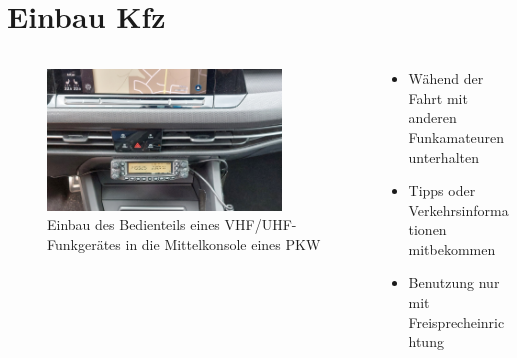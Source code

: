 
\section{Einbau Kfz}
\label{section:einbau_kfz}
\begin{frame}%

\begin{columns}
    \begin{column}{0.48\textwidth}
    
\begin{figure}
    \includegraphics[width=0.85\textwidth]{foto/75}
    \caption{\scriptsize Einbau des Bedienteils eines VHF/UHF-Funkgerätes in die Mittelkonsole eines PKW}
    \label{n_mobilfunkgeraet}
\end{figure}

    \end{column}
   \begin{column}{0.48\textwidth}
       \begin{itemize}
  \item Wähend der Fahrt mit anderen Funkamateuren unterhalten
  \item Tipps oder Verkehrsinformationen mitbekommen
  \item Benutzung nur mit Freisprecheinrichtung
  \end{itemize}

   \end{column}
\end{columns}

\end{frame}

